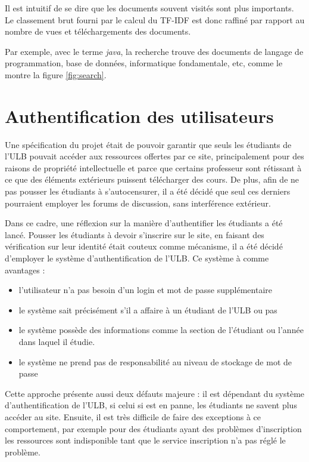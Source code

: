 \documentclass[a4paper,12pt]{article}
\begin{document}
Il est intuitif de se dire que les documents souvent visités sont
plus importants. Le classement brut fourni par le calcul du TF-IDF est donc raffiné
par rapport au nombre de vues et téléchargements des documents.

Par exemple, avec le terme \textit{java}, la recherche trouve des documents de langage
de programmation, base de données, informatique fondamentale, etc, comme le montre la figure
\ref{fig:search}.


\section{Authentification des utilisateurs}

Une spécification du projet était de pouvoir garantir que seuls les étudiants de l'ULB
pouvait accéder aux ressources offertes par ce site, principalement pour des raisons
de propriété intellectuelle et parce que certains professeur sont rétissant à 
ce que des éléments extérieurs puissent télécharger des cours. De plus, afin
de ne pas pousser les étudiants à s'autocensurer, il a été décidé que seul ces derniers
pourraient employer les forums de discussion, sans interférence extérieur.

Dans ce cadre, une réflexion sur la manière d'authentifier les étudiants
a été lancé. Pousser les étudiants à devoir s'inscrire sur le site, en faisant des
vérification sur leur identité était couteux comme mécanisme, il a été décidé
d'employer le système d'authentification de l'ULB. Ce système à comme avantages :
\begin{itemize}
\item l'utilisateur n'a pas besoin d'un login et mot de passe supplémentaire
\item le système sait précisément s'il a affaire à un étudiant de l'ULB ou pas
\item le système possède des informations comme la section de l'étudiant ou
      l'année dans laquel il étudie.
\item le système ne prend pas de responsabilité au niveau de stockage de mot de passe
\end{itemize}

Cette approche présente aussi deux défauts majeure : il est dépendant du système
d'authentification de l'ULB, si celui si est en panne, les étudiants ne savent plus
accéder au site. Ensuite, il est très difficile de faire des exceptions à ce comportement,
par exemple pour des étudiants ayant des problèmes d'inscription les ressources
sont indisponible tant que le service inscription n'a pas réglé le problème.
\end{document}
